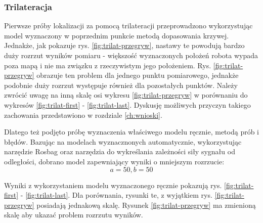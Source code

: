 \subsubsection{Trilateracja}
Pierwsze próby lokalizacji za pomocą trilateracji przeprowadzono wykorzystując model wyznaczony w poprzednim punkcie metodą dopasowania krzywej. Jednakże, jak pokazuje rys. \ref{fig:trilat-przegryw}, nastawy te powodują bardzo duży rozrzut wyników pomiaru - większość wyznaczonych położeń robota wypada poza mapą i nie ma związku z rzeczywistym jego położeniem. Rys. \ref{fig:trilat-przegryw} obrazuje ten problem dla jednego punktu pomiarowego, jednakże podobnie duży rozrzut występuje również dla pozostałych punktów. Należy zwrócić uwagę na inną skalę osi wykresu \ref{fig:trilat-przegryw} w porównaniu do wykresów  \ref{fig:trilat-first} - \ref{fig:trilat-last}. Dyskusję możliwych przyczyn takiego zachowania przedstawiono w rozdziale \ref{ch:wnioski}.

Dlatego też podjęto próbę wyznaczenia właściwego modelu ręcznie, metodą prób i błędów. Bazując na modelach wyznacznonych automatycznie, wykorzystując narzędzie Rosbag oraz narzędzia do wykreślania zależności siły sygnału od odległości, dobrano model zapewniający wyniki o mniejszym rozrzucie:
\begin{equation}
 a=50, b=50
\end{equation}

Wyniki z wykorzystaniem modelu wyznaczonego ręcznie pokazują rys. \ref{fig:trilat-first} - \ref{fig:trilat-last}. Dla porównania, rysunki te, z wyjątkiem rys. \ref{fig:trilat-przegryw} posiadają jednakową skalę. Rysunek \ref{fig:trilat-przegryw} ma zmienioną skalę aby ukazać problem rozrzutu wyników. 

